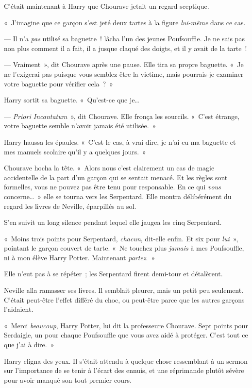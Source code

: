 C'était maintenant à Harry que Chourave jetait un regard sceptique.

«~J'imagine que ce garçon s'est jeté deux tartes à la figure \emph{lui-même} dans ce cas.

--- Il n'a \emph{pas} utilisé sa baguette~! lâcha l'un des jeunes Poufsouffle.
Je ne sais pas non plus comment il a fait, il a jusque claqué des doigts, et il y avait de la tarte~!

--- Vraiment~», dit Chourave après une pause.
Elle tira sa propre baguette.
«~Je ne l'exigerai pas puisque vous semblez être la victime, mais pourrais-je examiner votre baguette pour vérifier cela~?~»

Harry sortit sa baguette.
«~Qu'est-ce que je…

--- \emph{Priori Incantatum}~», dit Chourave.
Elle fronça les sourcils.
«~C'est étrange, votre baguette semble n'avoir jamais été utilisée.~»

Harry haussa les épaules. «~C'est le cas, à vrai dire, je n'ai eu ma baguette et mes manuels scolaire qu'il y a quelques jours.~»

Chourave hocha la tête.
«~Alors nous c'est clairement un cas de magie accidentelle de la part d'un garçon qui se sentait menacé.
Et les règles sont formelles, vous ne pouvez pas être tenu pour responsable.
En ce qui \emph{vous} concerne…~» elle se tourna vers les Serpentard.
Elle montra délibérément du regard les livres de Neville, éparpillés au sol.

S'en suivit un long silence pendant lequel elle jaugea les cinq Serpentard.

«~Moins trois points pour Serpentard, \emph{chacun}, dit-elle enfin.
Et six pour \emph{lui}~», pointant le garçon couvert de tarte.
«~Ne touchez plus \emph{jamais} à mes Poufsouffle, ni à mon élève Harry Potter.
Maintenant \emph{partez}.~»

Elle n'eut pas à se répéter~; les Serpentard firent demi-tour et détalèrent.

Neville alla ramasser ses livres.
Il semblait pleurer, mais un petit peu seulement.
C'était peut-être l'effet différé du choc, ou peut-être parce que les autres garçons l'aidaient.

«~Merci \emph{beaucoup}, Harry Potter, lui dit la professeure Chourave.
Sept points pour Serdaigle, un pour chaque Poufsouffle que vous avez aidé à protéger.
C'est tout ce que j'ai à dire.~»

Harry cligna des yeux.
Il s'était attendu à quelque chose ressemblant à un sermon sur l'importance de se tenir à l'écart des ennuis, et une réprimande plutôt sévère pour avoir manqué son tout premier cours.

